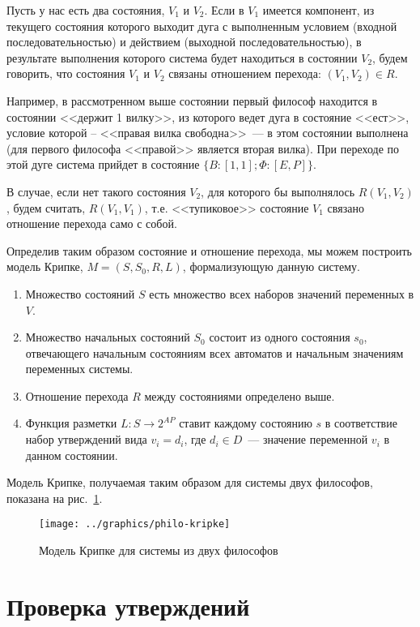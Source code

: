 Пусть у нас есть два состояния, $V_1$ и $V_2$. Если в $V_1$ имеется компонент, из текущего
состояния которого выходит дуга с выполненным условием (входной последовательностью) и
действием (выходной последовательностью), в результате выполнения которого система будет
находиться в состоянии $V_2$, будем говорить, что состояния $V_1$ и $V_2$ связаны
отношением перехода: $(V_1, V_2) \in R$.

Например, в рассмотренном выше состоянии первый философ находится в состоянии
<<держит 1 вилку>>, из которого ведет дуга в состояние <<ест>>, условие которой --
<<правая вилка свободна>>~--- в этом состоянии выполнена (для первого философа <<правой>>
является вторая вилка). При переходе по этой дуге система прийдет в состояние $\{B: [1, 1];
\Phi: [E, P]\}$.

В случае, если нет такого состояния $V_2$, для которого бы выполнялось $R(V_1, V_2)$,
будем считать, $R(V_1, V_1)$, т.е. <<тупиковое>> состояние $V_1$ связано отношение
перехода само с собой.

Определив таким образом состояние и отношение перехода, мы можем построить модель Крипке,
$M = (S, S_0, R, L)$, формализующую данную систему.
\begin{enumerate}
\item Множество состояний $S$ есть множество всех наборов значений переменных в $V$.
\item Множество начальных состояний $S_0$ состоит из одного состояния $s_0$, отвечающего
  начальным состояниям всех автоматов и начальным значениям переменных системы.
\item Отношение перехода $R$ между состояниями определено выше.
\item Функция разметки $L: S \rightarrow 2^{AP}$ ставит каждому состоянию $s$ в
  соответствие набор утверждений вида $v_i = d_i$, где $d_i \in D$~--- значение переменной
  $v_i$ в данном состоянии.
\end{enumerate}

Модель Крипке, получаемая таким образом для системы двух философов, показана на
рис.~\ref{fig:philo2-kripke}.

\begin{figure}[ht]
  \centering
  \texttt{[image: ../graphics/philo-kripke]}
  \caption{Модель Крипке для системы из двух философов}
  \label{fig:philo2-kripke}
\end{figure}

\section{Проверка утверждений}
\label{sec:kripke-verification}

